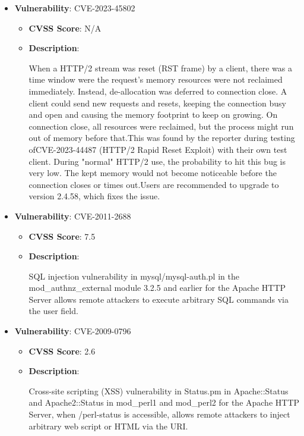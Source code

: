 \documentclass{article}
\begin{document}
\begin{itemize}
        \item \textbf{Vulnerability}: CVE-2023-45802
        \begin{itemize}
            \item \textbf{CVSS Score}:  N/A 
            \item \textbf{Description}:
            \parbox[t]{0.9\linewidth}{
                \ttfamily When a HTTP/2 stream was reset (RST frame) by a client, there was a time window were the request's memory resources were not reclaimed immediately. Instead, de-allocation was deferred to connection close. A client could send new requests and resets, keeping the connection busy and open and causing the memory footprint to keep on growing. On connection close, all resources were reclaimed, but the process might run out of memory before that.This was found by the reporter during testing ofCVE-2023-44487 (HTTP/2 Rapid Reset Exploit) with their own test client. During "normal" HTTP/2 use, the probability to hit this bug is very low. The kept memory would not become noticeable before the connection closes or times out.Users are recommended to upgrade to version 2.4.58, which fixes the issue.
            }
        \end{itemize}
    
        \item \textbf{Vulnerability}: CVE-2011-2688
        \begin{itemize}
            \item \textbf{CVSS Score}:  7.5 
            \item \textbf{Description}:
            \parbox[t]{0.9\linewidth}{
                \ttfamily SQL injection vulnerability in mysql/mysql-auth.pl in the mod\_authnz\_external module 3.2.5 and earlier for the Apache HTTP Server allows remote attackers to execute arbitrary SQL commands via the user field.
            }
        \end{itemize}
    
        \item \textbf{Vulnerability}: CVE-2009-0796
        \begin{itemize}
            \item \textbf{CVSS Score}:  2.6 
            \item \textbf{Description}:
            \parbox[t]{0.9\linewidth}{
                \ttfamily Cross-site scripting (XSS) vulnerability in Status.pm in Apache::Status and Apache2::Status in mod\_perl1 and mod\_perl2 for the Apache HTTP Server, when /perl-status is accessible, allows remote attackers to inject arbitrary web script or HTML via the URI.
            }
        \end{itemize}
    

\end{itemize}
\end{document}
